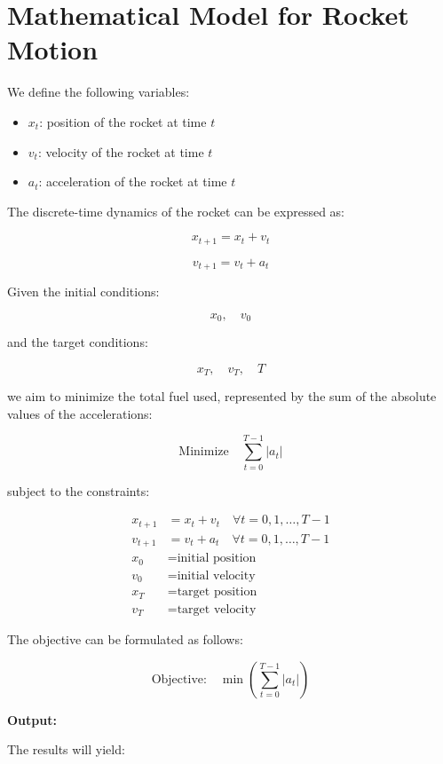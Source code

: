 \documentclass{article}
\begin{document}
\section*{Mathematical Model for Rocket Motion}

We define the following variables:

\begin{itemize}
    \item \( x_t \): position of the rocket at time \( t \)
    \item \( v_t \): velocity of the rocket at time \( t \)
    \item \( a_t \): acceleration of the rocket at time \( t \)
\end{itemize}

The discrete-time dynamics of the rocket can be expressed as:

\[
x_{t+1} = x_t + v_t
\]

\[
v_{t+1} = v_t + a_t
\]

Given the initial conditions:

\[
x_0, \quad v_0
\]

and the target conditions:

\[
x_T, \quad v_T, \quad T
\]

we aim to minimize the total fuel used, represented by the sum of the absolute values of the accelerations:

\[
\text{Minimize} \quad \sum_{t=0}^{T-1} |a_t|
\]

subject to the constraints:

\begin{align*}
x_{t+1} &= x_t + v_t \quad \forall t = 0, 1, \ldots, T-1 \\
v_{t+1} &= v_t + a_t \quad \forall t = 0, 1, \ldots, T-1 \\
x_0 &= \text{initial position} \\
v_0 &= \text{initial velocity} \\
x_T &= \text{target position} \\
v_T &= \text{target velocity}
\end{align*}

The objective can be formulated as follows:

\begin{equation}
\text{Objective:} \quad \min \left( \sum_{t=0}^{T-1} |a_t| \right)
\end{equation}

\textbf{Output:} 

The results will yield:
\end{document}
